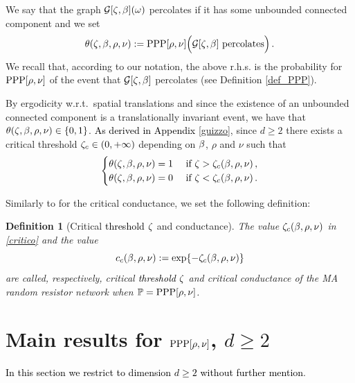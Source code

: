 \documentclass[12pt,a4paper,reqno]{amsart}
\newtheorem{Definition}[Theorem]{Definition}
\newcommand{\cG}{\ensuremath{\mathcal G}}
\newcommand{\bbP}{{\ensuremath{\mathbb P}} }
\newcommand{\rosso}{\textcolor{black}} %
\newcommand{\be}{\begin{equation}}
\newcommand{\en}{\end{equation}}
\begin{document}
\medskip

We say that the graph $\cG[\z,\b](\o) $ percolates if it has  some unbounded connected component and we set 
\be
\theta (\z,\b, \rho, \nu):= {\rm PPP}[\rho, \nu]  \Big( \cG [\z,\b] \text{ percolates} \Big)\,.
\en
We recall that, according to our notation, the above r.h.s. is the probability for ${\rm PPP}[\rho, \nu]  $ of the event that $\cG [\z,\b]$ percolates (see Definition \ref{def_PPP}). 

By ergodicity w.r.t.~spatial translations and since the existence of an unbounded connected component is a translationally  invariant event,  we have  that $\theta(\zeta,\beta, \rho, \nu) \in \{0,1\}$. %
\rosso{As derived in Appendix \ref{guizzo}}, since $d\geq 2$  there exists 
a critical threshold  $\zeta_c\in (0, +\infty) $  depending on $\beta$, $\rho$ and  $\nu$ such that 
\be\label{critico}
\begin{cases}
\theta(\z,\b, \rho, \nu) =1 & \text{ if } \z > \z_c(\b,\rho,\nu)\,,\\
\theta(\z,\b, \rho, \nu)=0 & \text{ if } \z< \z_c(\b,\rho,\nu)\,.
\end{cases}
\en




Similarly to \cite[Section~IV.B]{AHL} for the critical conductance, we set the following definition:
\begin{Definition}[Critical \rosso{threshold} $\zeta$ and conductance] \label{criticone}    The value $\zeta_c(\beta,\rho,\nu)$  in \eqref{critico}  and  the value 
\[c_c(\beta,\rho,\nu):= \exp\{-  \zeta_c(\beta,\rho,\nu) \}\]
  are  called, respectively,  \emph{critical \rosso{threshold} $\zeta$}   and  \emph{critical conductance} of the  MA random resistor network when $\bbP={\rm PPP}[\rho,\nu]$.
\end{Definition}
 

\section{Main results for  ${\rm PPP}[\rho, \nu]$, $d\geq 2$}\label{MR_PPP}

\rosso{In this section we restrict to dimension  $d\geq 2$ without further mention}.
\end{document}
